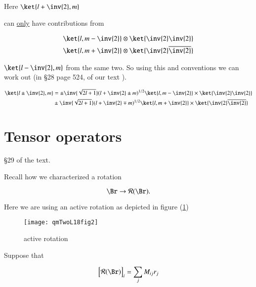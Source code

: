 Here $\ket{l + \inv{2}, m}$

can \underline{only} have contributions from 

\begin{align}\label{eqn:qmTwoL18:370}
\ket{l, m-\inv{2}} &\otimes \ket{\inv{2}\inv{2}} \\
\ket{l, m+\inv{2}} &\otimes \ket{\inv{2}\overline{\inv{2}}}
\end{align}

$\ket{l - \inv{2}, m}$ from the same two.  So using this and conventions we can work out (in \S 28 page 524, of our text \cite{desai2009quantum}).

\begin{equation}\label{eqn:qmTwoL18:390}
\begin{aligned}
\ket{l\pm \inv{2}, m} &=
\pm 
\inv{\sqrt{2 l + 1}}
(l + \inv{2} \pm m)^{1/2}
\ket{l, m - \inv{2}} \times \ket{\inv{2}\inv{2}} \\
&\pm 
\inv{\sqrt{2 l + 1}}
(l + \inv{2} \mp m)^{1/2}
\ket{l, m + \inv{2}} \times \ket{\inv{2} \overline{\inv{2}}}
\end{aligned}
\end{equation}

\section{Tensor operators}

\S 29 of the text.

Recall how we characterized a rotation

\begin{equation}\label{eqn:qmTwoL18:410}
\Br \rightarrow \mathcal{R}(\Br).
\end{equation}

Here we are using an active rotation as depicted in figure (\ref{fig:qmTwoL18:qmTwoL18fig2})

\begin{figure}[htp]
   \centering
   \texttt{[image: qmTwoL18fig2]}
   \caption{active rotation}\label{fig:qmTwoL18:qmTwoL18fig2}
\end{figure}

Suppose that 

\begin{equation}\label{eqn:qmTwoL18:430}
{\begin{bmatrix}
\mathcal{R}(\Br)
\end{bmatrix}
}_i
= 
\sum_j M_{ij} r_j
\end{equation}

